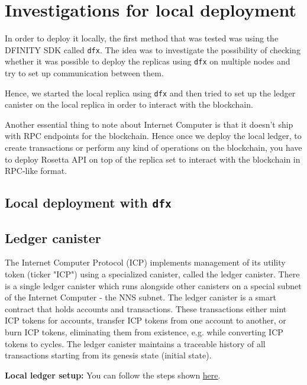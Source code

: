 \chapter{Investigations for local deployment}
\label{chap:chapterfour}

In order to deploy it locally, the first method that was tested was using the DFINITY SDK called \texttt{dfx}. The idea was to investigate the possibility of checking whether it was possible to deploy the replicas using \texttt{dfx} on multiple nodes and try to set up communication between them.

Hence, we started the local replica using \texttt{dfx} and then tried to set up the ledger canister on the local replica in order to interact with the blockchain.

Another essential thing to note about Internet Computer is that it doesn't ship with RPC endpoints for the blockchain. Hence once we deploy the local ledger, to create transactions or perform any kind of operations on the blockchain, you have to deploy Rosetta API on top of the replica set to interact with the blockchain in RPC-like format.

\section{Local deployment with \texttt{dfx}}

\section{Ledger canister}

The Internet Computer Protocol (ICP) implements management of its utility token (ticker "ICP") using a specialized canister, called the ledger canister. There is a single ledger canister which runs alongside other canisters on a special subnet of the Internet Computer - the NNS subnet. The ledger canister is a smart contract that holds accounts and transactions. These transactions either mint ICP tokens for accounts, transfer ICP tokens from one account to another, or burn ICP tokens, eliminating them from existence, e.g. while converting ICP tokens to cycles. The ledger canister maintains a traceable history of all transactions starting from its genesis state (initial state).

\textbf{Local ledger setup:} You can follow the steps shown \href{https://internetcomputer.org/docs/current/developer-docs/integrations/ledger/ledger-local-setup}{here}.

